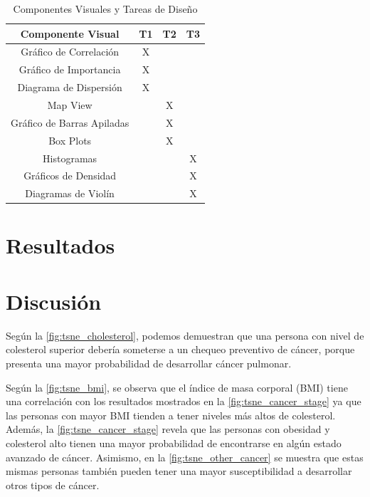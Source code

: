 \documentclass[10pt,journal,compsoc]{IEEEtran}
\begin{document}
\begin{table}[h!]
\centering
\caption{Componentes Visuales y Tareas de Diseño}
\begin{tabular}{|c|c|c|c|}
\hline
\textbf{Componente Visual} & \textbf{T1} & \textbf{T2} & \textbf{T3} \\ \hline
Gráfico de Correlación & X &  &  \\ \hline
Gráfico de Importancia & X &  &  \\ \hline
Diagrama de Dispersión & X &  &  \\ \hline
Map View &  & X &  \\ \hline
Gráfico de Barras Apiladas &  & X &  \\ \hline
Box Plots &  & X &  \\ \hline
Histogramas &  &  & X \\ \hline
Gráficos de Densidad &  &  & X \\ \hline
Diagramas de Violín &  &  & X \\ \hline
\end{tabular}
\label{tab:visualtareas}
\end{table}


\section{Resultados}

\section{Discusión}
Según la \autoref{fig:tsne_cholesterol}, podemos demuestran que una persona con nivel de colesterol superior debería someterse a un chequeo preventivo de cáncer, porque presenta una mayor probabilidad de desarrollar  cáncer pulmonar.

Según la \autoref{fig:tsne_bmi}, se observa que el índice de masa corporal (BMI) tiene una correlación con los resultados mostrados en la  \autoref{fig:tsne_cancer_stage} ya que las personas con mayor BMI tienden a tener niveles más altos de colesterol. Además, la  \autoref{fig:tsne_cancer_stage} revela que las personas con obesidad y colesterol alto tienen una mayor probabilidad de encontrarse en algún estado avanzado de cáncer. Asimismo, en la \autoref{fig:tsne_other_cancer} se muestra que estas mismas personas también pueden tener una mayor susceptibilidad a desarrollar otros tipos de cáncer.
\end{document}
